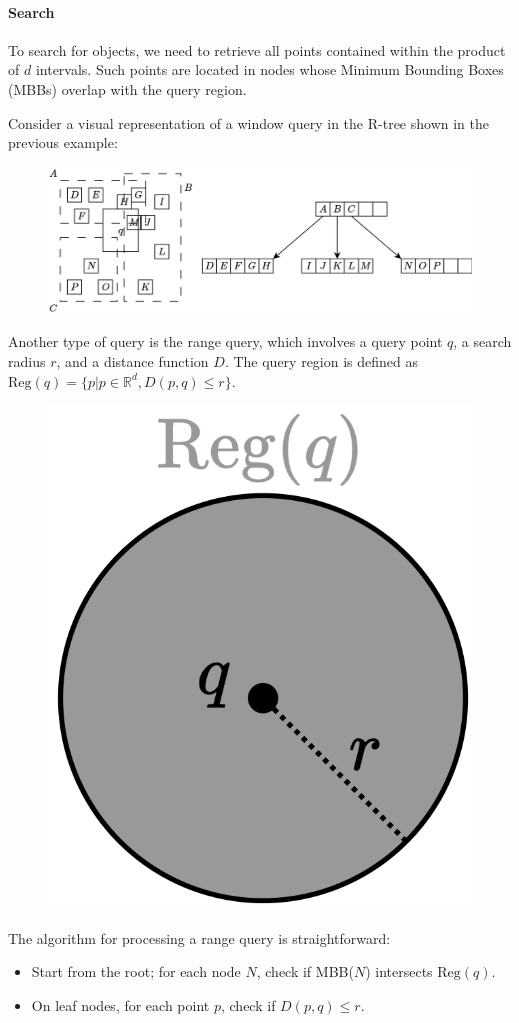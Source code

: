 \paragraph*{Search}
To search for objects, we need to retrieve all points contained within the product of $d$ intervals. 
Such points are located in nodes whose Minimum Bounding Boxes (MBBs) overlap with the query region.
\begin{example}
    Consider a visual representation of a window query in the R-tree shown in the previous example:
    \begin{figure}[H]
        \centering
        \includegraphics[width=0.75\linewidth]{images/r3.png}
    \end{figure}
\end{example}
Another type of query is the range query, which involves a query point $q$, a search radius $r$, and a distance function $D$.
The query region is defined as $\text{Reg}(q)=\{p|p \in \mathbb{R}^d, D(p,q) \leq r\}$. 
\begin{figure}[H]
    \centering
    \includegraphics[width=0.15\linewidth]{images/r4.png}
\end{figure}
The algorithm for processing a range query is straightforward:
\begin{itemize}
    \item Start from the root; for each node $N$, check if MBB($N$) intersects $\text{Reg}(q)$. 
    \item On leaf nodes, for each point $p$, check if $D(p,q) \leq r$. 
\end{itemize}

